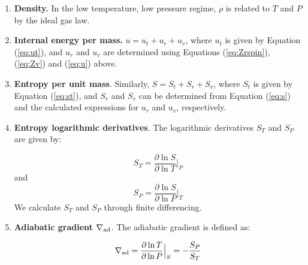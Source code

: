 \begin{enumerate}

\item{\textbf{Density.}} In the low temperature, low pressure regime, $\rho$ is related to $T$ and $P$ by the ideal gas law. %
\item{\textbf{Internal energy per mass.}} $u=u_t+u_r+u_v$, where $u_t$ is given by Equation (\ref{eq:ut}), and $u_r$ and $u_v$ are determined using Equations (\ref{eq:Zrspin}), (\ref{eq:Zv}) and (\ref{eq:u}) above.
\item{\textbf{Entropy per unit mass}}. Similarly, $S=S_t+S_r+S_v$, where $S_t$ is given by Equation (\ref{eq:st}), and $S_r$ and $S_v$ can be determined from Equation (\ref{eq:s}) and the calculated expressions for $u_r$ and $u_v$, respectively.
\item{\textbf{Entropy logarithmic derivatives}}. The logarithmic derivatives $S_T$ and $S_P$ are given by:

\begin{equation}
\label{eq:sT}
S_T=\frac{\partial \ln{S}}{\partial \ln{T}} \Big |_P
\end{equation}
and
\begin{equation}
\label{eq:sP}
S_P=\frac{\partial \ln{S}}{\partial \ln{P}} \Big |_T
\end{equation}
We calculate $S_T$ and $S_P$ through finite differencing. 

\item{\textbf{Adiabatic gradient $\nabla_{\rm ad}$}}. The adiabatic gradient is defined as:

\begin{equation}
\label{eq:deladSP}
\nabla_{\rm ad}=\frac{\partial \ln{T}}{\partial \ln{P}} \Big |_S = -\frac{S_P}{S_T}
\end{equation}


\end{enumerate}
